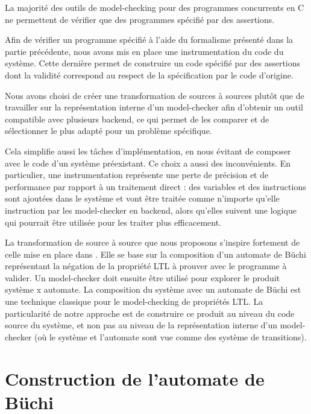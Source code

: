 \label{sec:Theme2}

La majorité des outils de model-checking pour des programmes concurrents
en C ne permettent de vérifier que des programmes spécifié par des
assertions.

Afin de vérifier un programme spécifié à l'aide du formalisme présenté
dans la partie précédente, nous avons mis en place une instrumentation
du code du système. Cette dernière permet de construire un code spécifié
par des assertions dont la validité correspond au respect de la
spécification par le code d'origine.

Nous avons choisi de créer une transformation de sources à sources
plutôt que de travailler sur la représentation interne d'un
model-checker afin d'obtenir un outil compatible avec plusieurs backend,
ce qui permet de les comparer et de sélectionner le plus adapté pour un
problème spécifique.

Cela simplifie aussi les tâches d'implémentation, en nous évitant de
composer avec le code d'un système préexistant. Ce choix a aussi des
inconvénients. En particulier, une instrumentation représente une perte
de précision et de performance par rapport à un traitement direct : des
variables et des instructions sont ajoutées dans le système et vont être
traitée comme n'importe qu'elle instruction par les model-checker en
backend, alors qu'elles suivent une logique qui pourrait être utilisée
pour les traiter plus efficacement.

La transformation de source à source que nous proposons s'inspire
fortement de celle mise en place dans \cite{morse_ltl}. Elle se base
sur la composition d'un automate de Büchi représentant la négation de la
propriété LTL à prouver avec le programme à valider. Un model-checker
doit ensuite être utilisé pour explorer le produit système x automate.
La composition du système avec un automate de Büchi est une technique
classique pour le model-checking de propriétés
LTL\cite{25_years_of_model_checking}. La particularité de notre
approche est de construire ce produit au niveau du code source du
système, et non pas au niveau de la représentation interne d'un
model-checker (où le système et l'automate sont vue comme des système de
transitions).

\section{Construction de l'automate de Büchi}

